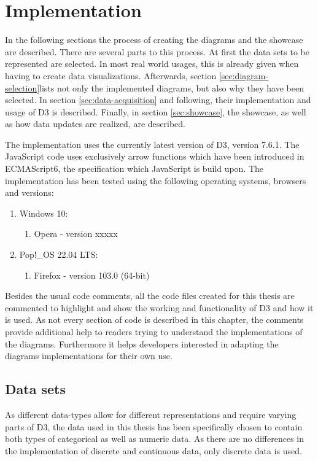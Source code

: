 \chapter{Implementation}


In the following sections the process of creating the diagrams and the showcase are described. There are several parts to this process. At first the data sets to be represented are selected. In most real world usages, this is already given when having to create data visualizations. Afterwards, section \ref{sec:diagram-selection}lists not only the implemented diagrams, but also why they have been selected. In section \ref{sec:data-acquisition} and following, their implementation and usage of D3 is described. Finally, in section \ref{sec:showcase}, the showcase, as well as how data updates are realized, are described.

The implementation uses the currently latest version of D3, version 7.6.1. The JavaScript code uses exclusively arrow functions which have been introduced in ECMAScript6, the specification which JavaScript is build upon\cite{ecmascript}. The implementation has been tested using the following operating systems, browsers and versions:
\begin{enumerate}
    \item Windows 10:
    \begin{enumerate}
        \item Opera - version xxxxx
    \end{enumerate}
    \item Pop!\_OS 22.04 LTS:
    \begin{enumerate}
        \item Firefox - version 103.0 (64-bit)
    \end{enumerate}
\end{enumerate}

Besides the usual code comments, all the code files created for this thesis are commented to highlight and show the working and functionality of D3 and how it is used. As not every section of code is described in this chapter, the comments provide additional help to readers trying to understand the implementations of the diagrams. Furthermore it helps developers interested in adapting the diagrams implementations for their own use.

\section{Data sets}
As different data-types allow for different representations and require varying parts of D3, the data used in this thesis has been specifically chosen to contain both types of categorical as well as numeric data. As there are no differences in the implementation of discrete and continuous data, only discrete data is used.

